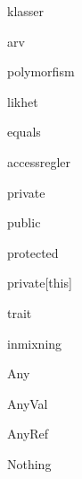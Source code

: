 \item klasser
\item arv
\item polymorfism
\item likhet
\item equals
\item accessregler
\item private
\item public
\item protected
\item private[this]
\item trait
\item inmixning
\item Any
\item AnyVal
\item AnyRef
\item Nothing